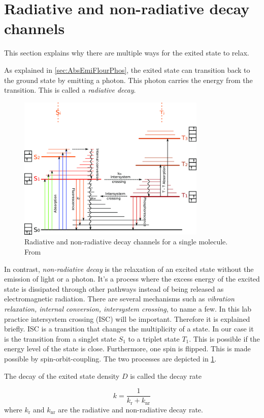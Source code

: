 \section[Decay channels]{Radiative and non-radiative decay channels}
\label{sec:TheoDecayChannels}

This section explains why there are multiple ways for the exited state to relax.

As explained in \cref{sec:AbsEmiFlourPhos}, the exited state can transition back to the ground state by emitting a photon. This 
photon carries the energy from the transition. This is called a \textit{radiative decay}.

\begin{figure}[ht]
    \centering
    \includegraphics[width = 0.8\textwidth]{Bilder/Grundlagen/Radiative-and-nonradiative-decay-processes-for-systems-obeying-Kashas-rule-Non.png}
    \caption{Radiative and non-radiative decay channels for a single molecule. From \cite{JulienFrancoisGorenflot.2015}}
    \label{fig:DecyChannels}
\end{figure}

In contrast, \textit{non-radiative decay} is the relaxation of an excited state without the emission of light or a photon. It's a process where the excess energy of the excited state is dissipated through other pathways instead of being released as electromagnetic radiation.
There are several mechanisms such as \textit{vibration relaxation, internal conversion, intersystem crossing}, to name a few. In this lab practice intersystem crossing (ISC) will be important. Therefore it is explained briefly.
ISC is a transition that changes the multiplicity of a state. In our case it is the transition from a singlet state $S_{\mathrm{1}}$ to a triplet state $T_{\mathrm{1}}$. This is possible if the
energy level of the state is close. Furthermore, one spin is flipped. This is made possible by spin-orbit-coupling. The two processes are depicted in \cref{fig:DecyChannels}.

The decay of the exited state density $D$ is called the decay rate 

\begin{equation}
    k = \frac{1}{k_{\mathrm{r}}+k_{\mathrm{nr}}}
\end{equation}
where $k_\mathrm{r}$ and $k_{\mathrm{nr}}$ are the radiative and non-radiative decay rate.